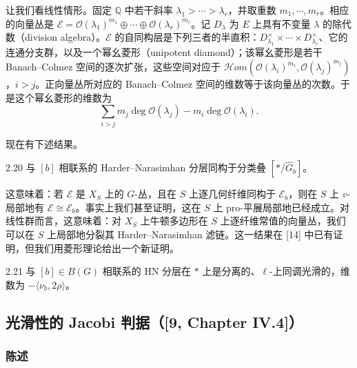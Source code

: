 让我们看线性情形。固定 $\mathbb Q$ 中若干斜率 $\lambda_1>\cdots>\lambda_r$，并取重数 $m_1,\cdots,m_r$。相应的向量丛是 $\mathcal E=\mathcal O(\lambda_1)^{m_1}\oplus\cdots\oplus\mathcal O(\lambda_r)^{m_r}$。记 $D_\lambda$ 为 $E$ 上具有不变量 $\lambda$ 的除代数（division algebra）。$\mathcal E$ 的自同构层是下列三者的半直积：$D^\times_{\lambda_1}\times\cdots\times D^\times_{\lambda_r}$、它的连通分支群，以及一个幂幺菱形（unipotent diamond）；该幂幺菱形是若干 Banach--Colmez 空间的逐次扩张，这些空间对应于 $\mathcal Hom(\mathcal O(\lambda_i)^{m_i},\mathcal O(\lambda_j)^{m_j})$，$i>j$。正向量丛所对应的 Banach--Colmez 空间的维数等于该向量丛的次数。于是这个幂幺菱形的维数为
\[
\sum_{i>j}m_j\deg\mathcal O(\lambda_j)-m_i\deg\mathcal O(\lambda_i).
\]

现在有下述结果。
\begin{thm}{2.20}
与 $[b]$ 相联系的 Harder--Narasimhan 分层同构于分类叠 $[*/\widehat G_b]$。\label{thm:a3-2-20}
\end{thm}

这意味着：若 $\mathcal E$ 是 $X_S$ 上的 $G$-丛，且在 $S$ 上逐几何纤维同构于 $\mathcal E_b$，则在 $S$ 上 $v$-局部地有 $\mathcal E\cong\mathcal E_b$。事实上我们甚至证明，这在 $S$ 上 pro-平展局部地已经成立。对线性群而言，这意味着：对 $X_S$ 上牛顿多边形在 $S$ 上逐纤维常值的向量丛，我们可以在 $S$ 上局部地分裂其 Harder--Narasimhan 滤链。这一结果在 [14] 中已有证明，但我们用菱形理论给出一个新证明。
\begin{cor}{2.21}
与 $[b]\in B(G)$ 相联系的 HN 分层在 $*$ 上是分离的、$\ell$-上同调光滑的，维数为 $-\langle\nu_b,2\rho\rangle$。\label{cor:a3-2-21}
\end{cor}

\subsection{光滑性的 Jacobi 判据（[9, Chapter IV.4]）}\label{sec:a3-2-7}

\subsubsection{陈述}

